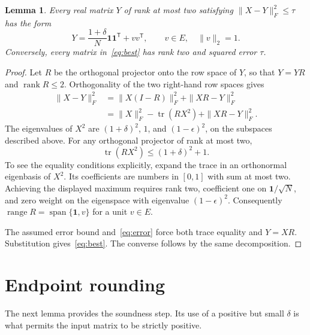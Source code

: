 \documentclass[11pt]{article}
\newtheorem{lemma}[theorem]{Lemma}
\newcommand{\rank}{\operatorname{rank}}
\newcommand{\tr}{\operatorname{tr}}
\newcommand{\one}{\mathbf 1}
\begin{document}
\begin{lemma}\label{lem:best}
Every real matrix $Y$ of rank at most two satisfying $\|X-Y\|_F^2\leq\tau$ has the form
\begin{equation}\label{eq:best}
 Y=\frac{1+\delta}{N}\one\one^{\mathsf T}+vv^{\mathsf T},
 \qquad v\in E,\quad \|v\|_2=1.
\end{equation}
Conversely, every matrix in~\eqref{eq:best} has rank two and squared error $\tau$.
\end{lemma}
\begin{proof}
Let $R$ be the orthogonal projector onto the row space of $Y$, so that $Y=YR$ and $\rank R\leq2$. Orthogonality of the two right-hand row spaces gives
\begin{align*}
 \|X-Y\|_F^2
 &=\|X(I-R)\|_F^2+\|XR-Y\|_F^2\\
 &=\|X\|_F^2-\tr(RX^2)+\|XR-Y\|_F^2.
\end{align*}
The eigenvalues of $X^2$ are $(1+\delta)^2$, $1$, and $(1-\epsilon)^2$, on the subspaces described above. For any orthogonal projector of rank at most two,
\[
 \tr(RX^2)\leq(1+\delta)^2+1.
\]
To see the equality conditions explicitly, expand the trace in an orthonormal eigenbasis of $X^2$. Its coefficients are numbers in $[0,1]$ with sum at most two. Achieving the displayed maximum requires rank two, coefficient one on $\one/\sqrt N$, and zero weight on the eigenspace with eigenvalue $(1-\epsilon)^2$. Consequently $\operatorname{range}R=\operatorname{span}\{\one,v\}$ for a unit $v\in E$.

The assumed error bound and~\eqref{eq:error} force both trace equality and $Y=XR$. Substitution gives~\eqref{eq:best}. The converse follows by the same decomposition.
\end{proof}

\section{Endpoint rounding}
The next lemma provides the soundness step. Its use of a positive but small $\delta$ is what permits the input matrix to be strictly positive.
\end{document}
